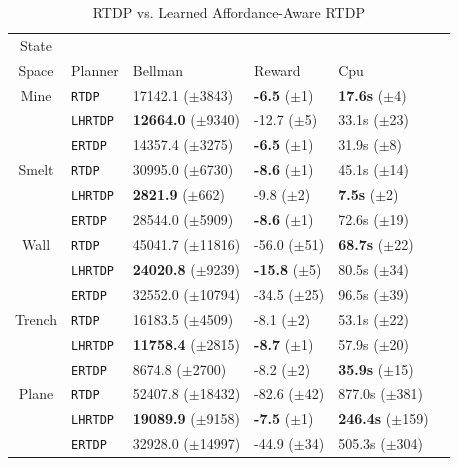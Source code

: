 \documentclass[conference]{IEEEtran}
\begin{document}
\begin{table}[H]
\centering
\caption{RTDP vs. Learned Affordance-Aware RTDP}
\begin{tabular}{ c l  | l l l l}
  State \\ Space	&	Planner 		&	Bellman			&	Reward 		& Cpu \\ \hline
Mine 	& \texttt{RTDP} 	& 17142.1 ($\pm$3843) 		& {\bf -6.5} ($\pm$1) 	& {\bf 17.6s}   ($\pm$4) \\
		& \texttt{LHRTDP} 	& {\bf 12664.0} ($\pm$9340) 	& -12.7 ($\pm$5) 		& 33.1s   ($\pm$23) \\
		& \texttt{ERTDP} 	& 14357.4 ($\pm$3275) 		& {\bf -6.5}   ($\pm$1) 	& 31.9s   ($\pm$8) \\ \hline
Smelt 	& \texttt{RTDP} 	& 30995.0 ($\pm$6730) 		& {\bf -8.6}   ($\pm$1) 	& 45.1s   ($\pm$14) \\
		& \texttt{LHRTDP} 	& {\bf 2821.9} 	 ($\pm$662) 	& -9.8   ($\pm$2) 		& {\bf 7.5s}  ($\pm$2) \\
		& \texttt{ERTDP} 	& 28544.0 ($\pm$5909) 		& {\bf -8.6}   ($\pm$1) 	& 72.6s   ($\pm$19) \\ \hline
Wall 		& \texttt{RTDP} 	& 45041.7 ($\pm$11816) 		& -56.0   ($\pm$51) 		& {\bf 68.7s}   ($\pm$22) \\
		& \texttt{LHRTDP} 	& {\bf 24020.8} ($\pm$9239) 	& {\bf -15.8}   ($\pm$5) 	& 80.5s   ($\pm$34) \\
		& \texttt{ERTDP} 	& 32552.0 ($\pm$10794) 		& -34.5   ($\pm$25) 		& 96.5s   ($\pm$39) \\ \hline
Trench 	& \texttt{RTDP}  	& 16183.5 ($\pm$4509) 		& -8.1   ($\pm$2) 		& 53.1s   ($\pm$22) \\
		& \texttt{LHRTDP} 	& {\bf 11758.4} ($\pm$2815) 	& {\bf -8.7}   ($\pm$1) 	& 57.9s   ($\pm$20) \\
		& \texttt{ERTDP} 	& 8674.8 	($\pm$2700) 		& -8.2   ($\pm$2) 		& {\bf 35.9s}   ($\pm$15) \\ \hline
Plane 	& \texttt{RTDP} 	& 52407.8 ($\pm$18432) 		& -82.6   ($\pm$42) 		& 877.0s   ($\pm$381) \\
		& \texttt{LHRTDP} 	& {\bf 19089.9} ($\pm$9158) 	& {\bf -7.5}   ($\pm$1) 	& {\bf 246.4s}   ($\pm$159) \\
		& \texttt{ERTDP} 	& 32928.0 ($\pm$14997) 		& -44.9   ($\pm$34) 		& 505.3s   ($\pm$304) \\
\end{tabular}
\label{table:minecraft_results}
\end{table}
\end{document}
